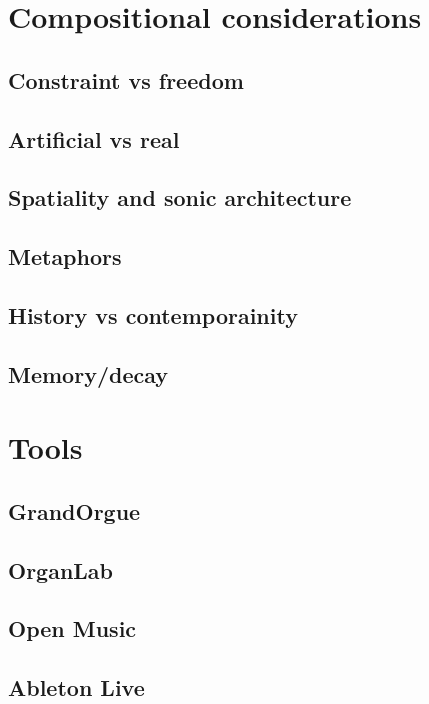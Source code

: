 \documentclass[12pt,twoside,maitrise]{dms}
\theoremstyle{definition}
\numberwithin{equation}{section}
\numberwithin{table}{chapter}
\numberwithin{figure}{chapter}
\begin{document}
\section{Compositional considerations}

\subsection{Constraint vs freedom}

\subsection{Artificial vs real}

\subsection{Spatiality and sonic architecture}

\subsection{Metaphors}

\subsection{History vs contemporainity}

\subsection{Memory/decay}

\section{Tools}

\subsection{GrandOrgue}

\subsection{OrganLab}

\subsection{Open Music}

\subsection{Ableton Live}
\end{document}
